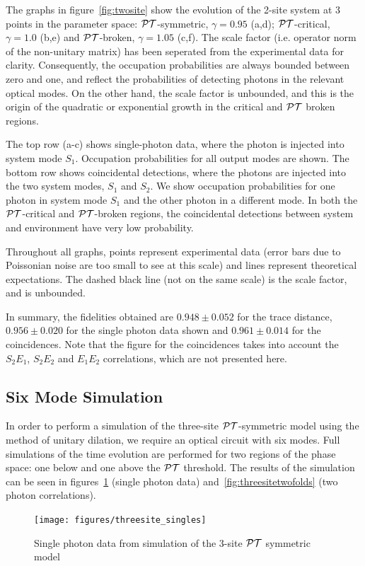 The graphs in figure~\ref{fig:twosite} show the evolution of the 2-site system
at 3 points in the parameter space: \(\mathcal{PT}{}\)-symmetric, \(\gamma=0.95\) (a,d);
\(\mathcal{PT}{}\)-critical, \(\gamma=1.0\) (b,e) and \(\mathcal{PT}{}\)-broken, \(\gamma=1.05\)
(c,f). The scale factor (i.e. operator norm of the non-unitary matrix) has been
seperated from the experimental data for clarity. Consequently, the occupation
probabilities are always bounded between zero and one, and reflect the
probabilities of detecting photons in the relevant optical modes. On the other
hand, the scale factor is unbounded, and this is the origin of the quadratic or
exponential growth in the critical and \(\mathcal{PT}{}\) broken regions.

The top row (a-c) shows single-photon data, where the photon is injected into
system mode \(S_1\). Occupation probabilities for all output modes are shown.
The bottom row shows coincidental detections, where the photons are injected
into the two system modes, \(S_1\) and \(S_2\). We show occupation probabilities
for one photon in system mode \(S_1\) and the other photon in a different mode.
In both the \(\mathcal{PT}{}\)-critical and \(\mathcal{PT}{}\)-broken regions, the coincidental
detections between system and environment have very low probability.

Throughout all graphs, points represent experimental data (error bars due to
Poissonian noise are too small to see at this scale) and lines represent
theoretical expectations. The dashed black line (not on the same scale) is the
scale factor, and is unbounded.

In summary, the fidelities obtained are \(0.948 \pm 0.052\) for the trace
distance, \(0.956 \pm 0.020\) for the single photon data shown and \(0.961 \pm
0.014\) for the coincidences. Note that the figure for the coincidences takes
into account the \(S_2 E_1\), \(S_2 E_2\) and \(E_1 E_2\) correlations, which
are not presented here.

\subsection{Six Mode Simulation}
\label{sec:SixMode}
In order to perform a simulation of the three-site \(\mathcal{PT}\)-symmetric model using
the method of unitary dilation, we require an optical circuit with six modes.
Full simulations of the time evolution are performed for two regions of the
phase space: one below and one above the \(\mathcal{PT}\) threshold. The results of the
simulation can be seen in figures~\ref{fig:threesitesingles} (single photon
data) and~\ref{fig:threesitetwofolds} (two photon correlations).
\begin{figure}[p]
  \centering
  \texttt{[image: figures/threesite\_singles]}
  \caption[Single photon data from simulation of the 3-site PT symmetric model]
  {Single photon data from simulation of the 3-site \(\mathcal{PT}\) symmetric model}
  \label{fig:threesitesingles}
\end{figure}

